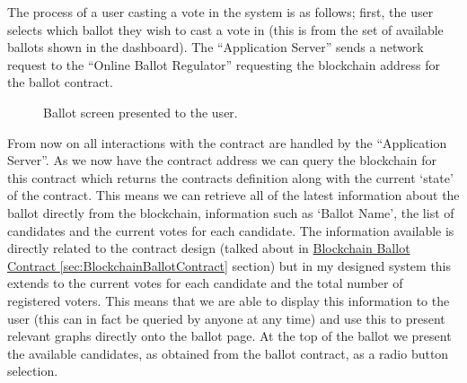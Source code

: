\documentclass{article}
\begin{document}
The process of a user casting a vote in the system is as follows; first, the user selects which ballot they wish to cast a vote in (this is from the set of available ballots shown in the dashboard). The ``Application Server'' sends a network request to the ``Online Ballot Regulator'' requesting the blockchain address for the ballot contract.


\begin{figure}[h]
	\noindent
	\caption{Ballot screen presented to the user.}
\end{figure}

From now on all interactions with the contract are handled by the ``Application Server''. As we now have the contract address we can query the blockchain for this contract which returns the contracts definition along with the current `state' of the contract. This means we can retrieve all of the latest information about the ballot directly from the blockchain, information such as `Ballot Name', the list of candidates and the current votes for each candidate. The information available is directly related to the contract design (talked about in \hyperref[sec:BlockchainBallotContract]{Blockchain Ballot Contract \ref*{sec:BlockchainBallotContract}} section) but in my designed system this extends to the current votes for each candidate and the total number of registered voters. This means that we are able to display this information to the user (this can in fact be queried by anyone at any time) and use this to present relevant graphs directly onto the ballot page. At the top of the ballot we present the available candidates, as obtained from the ballot contract, as a radio button selection.
\end{document}
